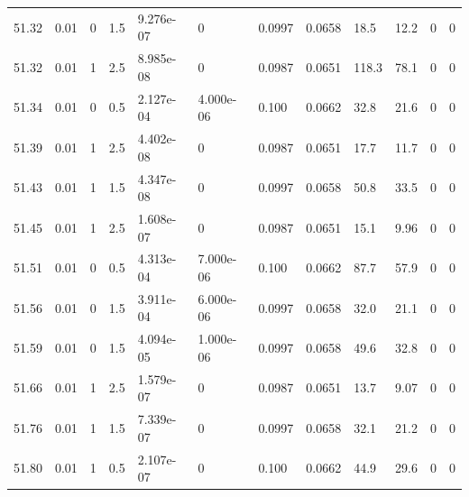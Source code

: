 \documentclass[preview]{standalone}
\begin{document}
{{{{{{{{{{{\begin{tabular}{L{1.2cm}C{1.2cm} C{0.3cm}C{0.5cm} C{1.4cm}C{1.4cm} C{1.4cm}C{1.4cm} C{1.6cm}C{1.6cm} C{1.6cm}C{1.6cm}}
  51.32  &  0.01  & 0     & 1.5 &  9.276e-07  & 0  &  0.0997&   0.0658& 18.5 & 12.2   &  0 & 0  \\ 
  51.32  &  0.01  & 1     & 2.5 &  8.985e-08  & 0  &  0.0987&   0.0651& 118.3 & 78.1   &  0 & 0  \\ 
  51.34  &  0.01  & 0     & 0.5 &  2.127e-04  & 4.000e-06  &  0.100&   0.0662& 32.8 & 21.6   &  0 & 0  \\ 
  51.39  &  0.01  & 1     & 2.5 &  4.402e-08  & 0  &  0.0987&   0.0651& 17.7 & 11.7   &  0 & 0  \\ 
  51.43  &  0.01  & 1     & 1.5 &  4.347e-08  & 0  &  0.0997&   0.0658& 50.8 & 33.5   &  0 & 0  \\ 
  51.45  &  0.01  & 1     & 2.5 &  1.608e-07  & 0  &  0.0987&   0.0651& 15.1 & 9.96   &  0 & 0  \\ 
  51.51  &  0.01  & 0     & 0.5 &  4.313e-04  & 7.000e-06  &  0.100&   0.0662& 87.7 & 57.9   &  0 & 0  \\ 
  51.56  &  0.01  & 0     & 1.5 &  3.911e-04  & 6.000e-06  &  0.0997&   0.0658& 32.0 & 21.1   &  0 & 0  \\ 
  51.59  &  0.01  & 0     & 1.5 &  4.094e-05  & 1.000e-06  &  0.0997&   0.0658& 49.6 & 32.8   &  0 & 0  \\ 
  51.66  &  0.01  & 1     & 2.5 &  1.579e-07  & 0  &  0.0987&   0.0651& 13.7 & 9.07   &  0 & 0  \\ 
  51.76  &  0.01  & 1     & 1.5 &  7.339e-07  & 0  &  0.0997&   0.0658& 32.1 & 21.2   &  0 & 0  \\ 
  51.80  &  0.01  & 1     & 0.5 &  2.107e-07  & 0  &  0.100&   0.0662& 44.9 & 29.6   &  0 & 0  \\ 
\hline 
\end{tabular} 

}}}}}}}}}}}
\end{document}
